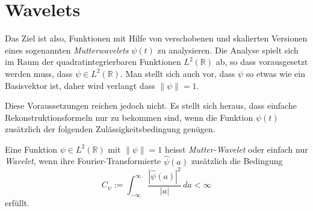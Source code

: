 %
%
%
\section{Wavelets}
Das Ziel ist also, Funktionen mit Hilfe von verschobenen und skalierten
Versionen eines sogenannten {\em Mutterwavelets} $\psi(t)$ zu analysieren.
Die Analyse spielt sich im Raum der quadratintegrierbaren Funktionen
$L^2(\mathbb R)$ ab, so dass vorausgesetzt werden muss,
dass $\psi\in L^2(\mathbb R)$.
Man stellt sich auch vor, dass $\psi$ so etwas wie ein Basisvektor ist,
daher wird verlangt dass $\|\psi\|=1$.

Diese Voraussetzungen reichen jedoch nicht.
Es stellt sich heraus, dass einfache Rekonstruktionsformeln nur zu
bekommen sind, wenn die Funktion $\psi(t)$ zusätzlich der folgenden
Zulässigkeitsbedingung genügen.

\begin{definition}
Eine Funktion $\psi\in L^2(\mathbb R)$ mit $\|\psi\|=1$ heisst 
{\em Mutter-Wavelet} oder einfach nur {\em Wavelet}, wenn ihre
Fourier-Transformierte $\hat{\psi}(a)$ zusätzlich die Bedingung
\[
C_{\psi}
:=
\int_{-\infty}^\infty \frac{|\hat{\psi}(a)|^2}{|a|}\,da < \infty
\]
erfüllt.
\end{definition}

